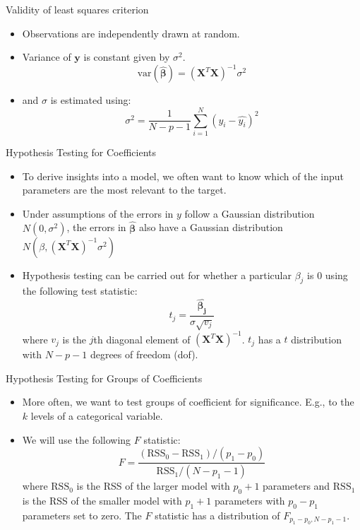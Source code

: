 \documentclass[aspectratio=169]{beamer}
\let \vec \mathbf
\begin{document}
\begin{frame}{Validity of least squares criterion}
    \begin{itemize}
        \item Observations are independently drawn at random.
        \item Variance of $\vec{y}$ is constant given by $\sigma^2$.
    \begin{equation*}
        \mathrm{var}(\hat{\bm{\beta}}) = (\vec{X}^T \vec{X})^{-1} \sigma^2
    \end{equation*}
    \item and $\sigma$ is estimated using:
    \begin{equation*}
        \sigma^2 = \frac{1}{N-p-1}\sum_{i=1}^N (y_i - \hat{y_i})^2
    \end{equation*}
    \end{itemize}
\end{frame}


\begin{frame}{Hypothesis Testing for Coefficients}
    \begin{itemize}
        \item To derive insights into a model, we often want to know which of the input parameters are the most relevant to the target.
        \item Under assumptions of the errors in $y$ follow a Gaussian distribution $N(0, \sigma^2)$, the errors in $\hat{\bm{\beta}}$ also have a Gaussian distribution $N(\beta, (\vec{X}^T \vec{X})^{-1} \sigma^2)$
        \item Hypothesis testing can be carried out for whether a particular $\beta_j$ is 0 using the following test statistic:
        \begin{equation*}
        t_j = \frac{\hat{\bm{\beta_j}}}{\sigma\sqrt{v_j}}
        \end{equation*}
        where $v_j$ is the $j$th diagonal element of $(\vec{X}^T \vec{X})^{-1}$. $t_j$ has a $t$ distribution with $N-p-1$ degrees of freedom (dof).
    \end{itemize}
\end{frame} 


\begin{frame}{Hypothesis Testing for Groups of Coefficients}
    \begin{itemize}
        \item More often, we want to test groups of coefficient for significance. E.g., to the $k$ levels of a categorical variable.
        \item We will use the following $F$ statistic:
        \begin{equation*}
        F = \frac{(\mathrm{RSS}_0 - \mathrm{RSS}_1)/(p_1-p_0)}{\mathrm{RSS}_1/(N-p_1-1)}
        \end{equation*}
        where $\mathrm{RSS}_0$ is the RSS of the larger model with $p_0 + 1$ parameters and $\mathrm{RSS}_1$ is the RSS of the smaller model with $p_1 + 1$ parameters with $p_0 - p_1$ parameters set to zero. The $F$ statistic has a distribution of $F_{p_1-p_0,N-p_1-1}$.
    \end{itemize}
\end{frame} 
\end{document}
